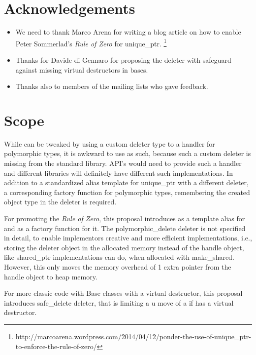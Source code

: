 \documentclass[ebook,11pt,article]{memoir}
\begin{document}
\chapter{Acknowledgements}
\begin{itemize}
\item We need to thank Marco Arena for writing a blog article on how to enable Peter Sommerlad's \emph{Rule of Zero} for unique_ptr. 
\footnote{{http://marcoarena.wordpress.com/2014/04/12/ponder-the-use-of-unique_ptr-to-enforce-the-rule-of-zero/}}
\item Thanks for Davide di Gennaro for proposing the deleter with safeguard against missing virtual destructors in bases.
\item Thanks also to members of the mailing lists who gave feedback. 
\end{itemize}

\chapter{Scope}

While  can be tweaked by using a custom deleter type to a handler for polymorphic types, it is awkward to use as such, because such a custom deleter is missing from the standard library. API's would need to provide such a handler and different libraries will definitely have different such implementations. In addition to a standardized alias template for unique_ptr with a different deleter, a corresponding factory function for polymorphic types, remembering the created object type in the deleter is required.

For promoting the \emph{Rule of Zero}, this proposal introduces  as a template alias for  and  as a factory function for it. The polymorphic_delete deleter is not specified in detail, to enable implementors creative and more efficient implementations, i.e., storing the deleter object in the allocated memory instead of the handle object, like shared_ptr implementations can do, when allocated with make_shared. However, this only moves the memory overhead of 1 extra pointer from the handle object to heap memory.

For more classic code with Base classes with a virtual destructor, this proposal introduces safe_delete deleter, that is limiting a u move of a  if  has a virtual destructor.
\end{document}
